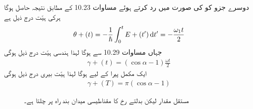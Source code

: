 دوسرے جزو کو  کی صورت میں رد کرتے ہوئے مساوات 10.23 کے مطابق نتیجہ حاصل ہوگا ہرکی ہیّت درج ذیل ہے 
\begin{align}
\theta + (t) = - \frac{1}{\hslash} \int_0^t E + (t') \dif t' = - \frac{\omega_1 t}{2}
\end{align}
جہاں مساوات 10.29 سے  ہوگا لہذا ہندسی ہیّت درج ذیل ہوگی 
\begin{align}
\gamma + (t) = (\cos \alpha - 1) \frac{\omega t}{2}
\end{align}
ایک مکمل پیرا کے لیے  ہوگا لہذا ہیّت بیری درج ذیل ہوگی 
\begin{align}
\gamma + (T) = \pi (\cos \alpha - 1)
\end{align}

\begin{figure}
\centering
{}
\caption{مستقل  مقدار لیکن بدلتے رخ کا مقناطیسی میدان بند راہ پر چلتا ہے۔}
\label{شکل_حرارت_نا_گزر_مقناطیسی_میدان_بند_راہ}
\end{figure}

